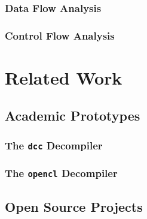 \documentclass[12pt, a4paper]{article}
\begin{document}

\subsubsection{Data Flow Analysis}

\cite{type_decomp}


\subsubsection{Control Flow Analysis}


\section{Related Work}


\subsection{Academic Prototypes}


\subsubsection{The \texttt{dcc} Decompiler}

\cite{rev_comp}


\subsubsection{The \texttt{opencl} Decompiler}

\cite{decomp_llvm}


\subsection{Open Source Projects}
\end{document}
